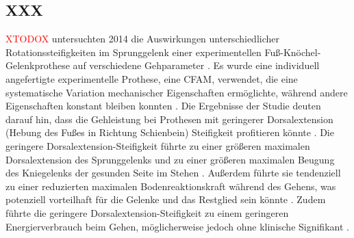 \subsection{XXX}
\textcolor{red}{XTODOX} untersuchten 2014 die Auswirkungen unterschiedlicher Rotationssteifigkeiten im Sprunggelenk einer experimentellen Fuß-Knöchel-Gelenkprothese auf verschiedene Gehparameter \cite{Major.2014}.  %
Es wurde eine individuell angefertigte experimentelle Prothese, eine CFAM, verwendet, die eine systematische Variation mechanischer Eigenschaften ermöglichte, während andere Eigenschaften konstant bleiben konnten \cite{Major.2014}. 
Die Ergebnisse der Studie deuten darauf hin, dass die Gehleistung bei Prothesen mit geringerer Dorsalextension (Hebung des Fußes in Richtung Schienbein) Steifigkeit profitieren könnte \cite{Major.2014}. %
Die geringere Dorsalextension-Steifigkeit führte zu einer größeren maximalen Dorsalextension des Sprunggelenks und zu einer größeren maximalen Beugung des Kniegelenks der gesunden Seite im Stehen \cite{Major.2014}. Außerdem führte sie tendenziell zu einer reduzierten maximalen Bodenreaktionskraft während des Gehens, was potenziell vorteilhaft für die Gelenke und das Restglied sein könnte \cite{Major.2014}.  Zudem führte die geringere Dorsalextension-Steifigkeit zu einem geringeren Energierverbrauch beim Gehen, möglicherweise jedoch ohne klinische Signifikant \cite{Major.2014}.

